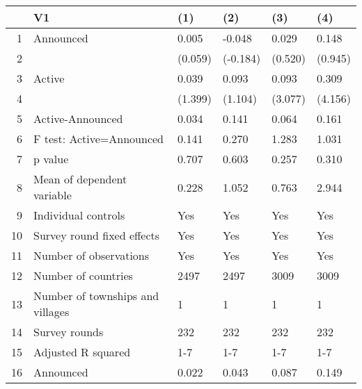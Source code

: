 \begin{table}[ht]
\centering
\begin{tabular}{rlllll}
  \hline
 & V1 & (1) & (2) & (3) & (4) \\ 
  \hline
1 & Announced & 0.005 & -0.048 & 0.029 & 0.148 \\ 
  2 &  & (0.059) & (-0.184) & (0.520) & (0.945) \\ 
  3 & Active & 0.039 & 0.093 & 0.093 & 0.309 \\ 
  4 &  & (1.399) & (1.104) & (3.077) & (4.156) \\ 
  5 & Active-Announced & 0.034 & 0.141 & 0.064 & 0.161 \\ 
  6 & F test: Active=Announced & 0.141 & 0.270 & 1.283 & 1.031 \\ 
  7 & p value & 0.707 & 0.603 & 0.257 & 0.310 \\ 
  8 & Mean of dependent variable & 0.228 & 1.052 & 0.763 & 2.944 \\ 
  9 & Individual controls & Yes & Yes & Yes & Yes \\ 
  10 & Survey round fixed effects & Yes & Yes & Yes & Yes \\ 
  11 & Number of observations & Yes & Yes & Yes & Yes \\ 
  12 & Number of countries & 2497 & 2497 & 3009 & 3009 \\ 
  13 & Number of townships and villages & 1 & 1 & 1 & 1 \\ 
  14 & Survey rounds & 232 & 232 & 232 & 232 \\ 
  15 & Adjusted R squared & 1-7 & 1-7 & 1-7 & 1-7 \\ 
  16 & Announced & 0.022 & 0.043 & 0.087 & 0.149 \\ 
   \hline
\end{tabular}
\end{table}

